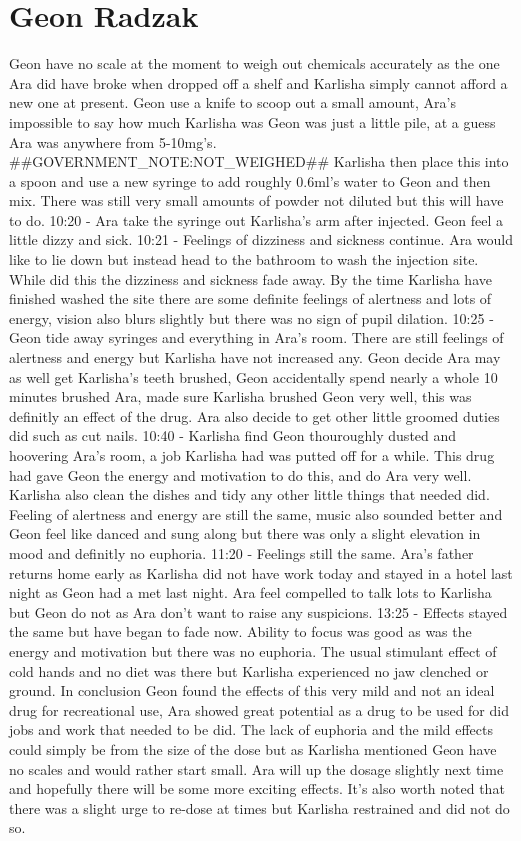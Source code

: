 \documentclass[12pt]{book}
\begin{document}
\chapter{Geon Radzak}

Geon have no scale at the moment to weigh out chemicals accurately as the one Ara did have broke when dropped off a shelf and Karlisha simply cannot afford a new one at present. Geon use a knife to scoop out a small amount, Ara's impossible to say how much Karlisha was Geon was just a little pile, at a guess Ara was anywhere from 5-10mg's. \#\#GOVERNMENT\_NOTE:NOT\_WEIGHED\#\# Karlisha then place this into a spoon and use a new syringe to add roughly 0.6ml's water to Geon and then mix. There was still very small amounts of powder not diluted but this will have to do. 10:20 - Ara take the syringe out Karlisha's arm after injected. Geon feel a little dizzy and sick. 10:21 - Feelings of dizziness and sickness continue. Ara would like to lie down but instead head to the bathroom to wash the injection site. While did this the dizziness and sickness fade away. By the time Karlisha have finished washed the site there are some definite feelings of alertness and lots of energy, vision also blurs slightly but there was no sign of pupil dilation. 10:25 - Geon tide away syringes and everything in Ara's room. There are still feelings of alertness and energy but Karlisha have not increased any. Geon decide Ara may as well get Karlisha's teeth brushed, Geon accidentally spend nearly a whole 10 minutes brushed Ara, made sure Karlisha brushed Geon very well, this was definitly an effect of the drug. Ara also decide to get other little groomed duties did such as cut nails. 10:40 - Karlisha find Geon thouroughly dusted and hoovering Ara's room, a job Karlisha had was putted off for a while. This drug had gave Geon the energy and motivation to do this, and do Ara very well. Karlisha also clean the dishes and tidy any other little things that needed did. Feeling of alertness and energy are still the same, music also sounded better and Geon feel like danced and sung along but there was only a slight elevation in mood and definitly no euphoria. 11:20 - Feelings still the same. Ara's father returns home early as Karlisha did not have work today and stayed in a hotel last night as Geon had a met last night. Ara feel compelled to talk lots to Karlisha but Geon do not as Ara don't want to raise any suspicions. 13:25 - Effects stayed the same but have began to fade now. Ability to focus was good as was the energy and motivation but there was no euphoria. The usual stimulant effect of cold hands and no diet was there but Karlisha experienced no jaw clenched or ground. In conclusion Geon found the effects of this very mild and not an ideal drug for recreational use, Ara showed great potential as a drug to be used for did jobs and work that needed to be did. The lack of euphoria and the mild effects could simply be from the size of the dose but as Karlisha mentioned Geon have no scales and would rather start small. Ara will up the dosage slightly next time and hopefully there will be some more exciting effects. It's also worth noted that there was a slight urge to re-dose at times but Karlisha restrained and did not do so.
\end{document}
